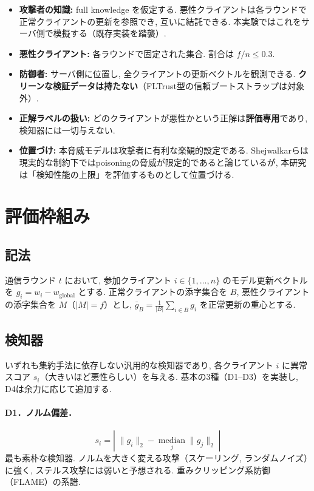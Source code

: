 \documentclass[a4j, twocolumn, dvipdfmx]{jsarticle}
\begin{document}
\begin{itemize}
  \item \textbf{攻撃者の知識:} full knowledge を仮定する. 悪性クライアントは各ラウンドで正常クライアントの更新を参照でき, 互いに結託できる. 本実験ではこれをサーバ側で模擬する（既存実装を踏襲）.
  \item \textbf{悪性クライアント:} 各ラウンドで固定された集合. 割合は $f/n \le 0.3$.
  \item \textbf{防御者:} サーバ側に位置し, 全クライアントの更新ベクトルを観測できる. \textbf{クリーンな検証データは持たない}（FLTrust\cite{cao2021fltrust}型の信頼ブートストラップは対象外）.
  \item \textbf{正解ラベルの扱い:} どのクライアントが悪性かという正解は\textbf{評価専用}であり, 検知器には一切与えない.
  \item \textbf{位置づけ:} 本脅威モデルは攻撃者に有利な楽観的設定である. Shejwalkarら\cite{shejwalkar2022back}は現実的な制約下ではpoisoningの脅威が限定的であると論じているが, 本研究は「検知性能の上限」を評価するものとして位置づける.
\end{itemize}

\section{評価枠組み}
\label{sec:framework}

\subsection{記法}

通信ラウンド $t$ において, 参加クライアント $i \in \{1,\dots,n\}$ のモデル更新ベクトルを $g_i = w_i - w_{\text{global}}$ とする. 正常クライアントの添字集合を $B$, 悪性クライアントの添字集合を $M$（$|M| = f$）とし, $\bar{g}_B = \frac{1}{|B|}\sum_{i \in B} g_i$ を正常更新の重心とする.

\subsection{検知器}
\label{sec:detectors}

いずれも集約手法に依存しない汎用的な検知器であり, 各クライアント $i$ に異常スコア $s_i$（大きいほど悪性らしい）を与える. 基本の3種（D1--D3）を実装し, D4は余力に応じて追加する.

\paragraph{D1．ノルム偏差．}
\begin{equation}
s_i = \left|\; \|g_i\|_2 - \operatorname*{median}_{j}\|g_j\|_2 \;\right|
\end{equation}
最も素朴な検知器. ノルムを大きく変える攻撃（スケーリング, ランダムノイズ）に強く, ステルス攻撃には弱いと予想される. 重みクリッピング系防御（FLAME\cite{nguyen2022flame}）の系譜.
\end{document}

